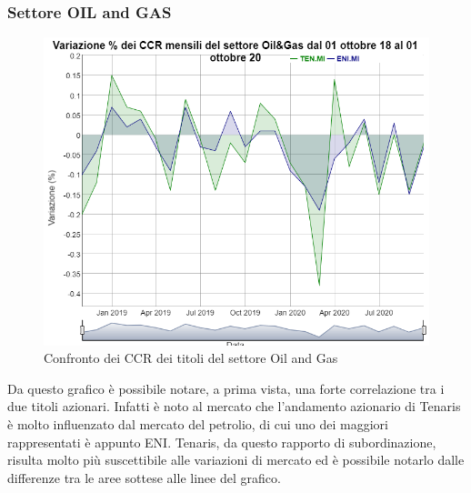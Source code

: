 \documentclass[12pt]{article}
\begin{document}
\subsubsection{Settore OIL and GAS}
\begin{figure}[!htb]
    \centering
    \includegraphics[width=1\textwidth]{immagini/setOil.png}
    \caption{Confronto dei CCR dei titoli del settore Oil and Gas}
\end{figure}
\FloatBarrier
Da questo grafico è possibile notare, a prima vista, una forte correlazione tra i due titoli azionari. Infatti è noto al mercato che l'andamento azionario di Tenaris è molto influenzato dal mercato del petrolio, di cui uno dei maggiori rappresentati è appunto ENI. Tenaris, da questo rapporto di subordinazione, risulta molto più suscettibile alle variazioni di mercato ed è possibile notarlo dalle differenze tra le aree sottese alle linee del grafico.
\newpage
\end{document}
